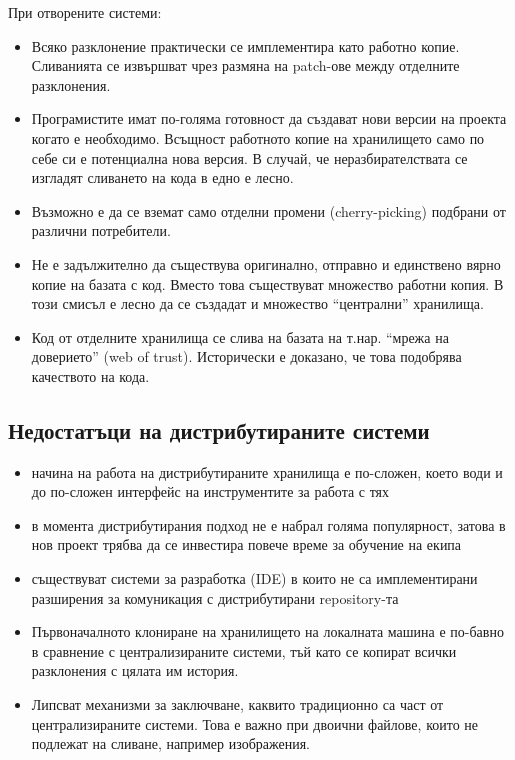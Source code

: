 \documentclass[a4paper]{article}
\begin{document}
      При отворените системи:
      \begin{itemize}
        \item Всяко разклонение практически се имплементира като работно копие. Сливанията се извършват чрез размяна на patch-ове между отделните разклонения.
        \item Програмистите имат по-голяма готовност да създават нови версии на проекта когато е необходимо. Всъщност работното копие на хранилището само по себе си е потенциална нова версия. В случай, че неразбирателствата се изгладят сливането на кода в едно е лесно.
        \item Възможно е да се вземат само отделни промени (cherry-picking) подбрани от различни потребители.
        \item Не е задължително да съществува оригинално, отправно и единствено вярно копие на базата с код. Вместо това съществуват множество работни копия. В този смисъл е лесно да се създадат и множество ``централни'' хранилища.
        \item Код от отделните хранилища се слива на базата на т.нар. ``мрежа на доверието'' (web of trust). Исторически е доказано, че това подобрява качеството на кода.
      \end{itemize}

  \subsection{Недостатъци на дистрибутираните системи}
    \begin{itemize}
      \item начина на работа на дистрибутираните хранилища е по-сложен, което
      води и до по-сложен интерфейс на инструментите за работа с тях
      \item в момента дистрибутирания подход не е набрал голяма популярност,
      затова в нов проект трябва да се инвестира повече време за обучение на
      екипа
      \item съществуват системи за разработка (IDE) в които не са
      имплементирани разширения за комуникация с дистрибутирани repository-та
      \item Първоначалното клониране на хранилището на локалната машина
      е по-бавно в сравнение с централизираните системи, тъй като се копират
      всички разклонения с цялата им история.
      \item Липсват механизми за заключване, каквито традиционно са част от
      централизираните системи. Това е важно при двоични файлове, които не
      подлежат на сливане, например изображения.
    \end{itemize}
\end{document}
